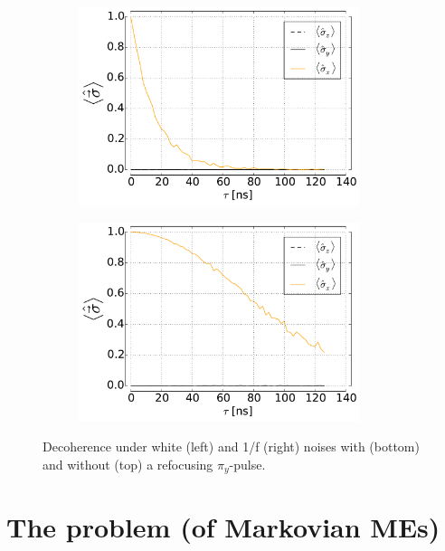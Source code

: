 \documentclass[12pt]{report}
\numberwithin{equation}{section}
\begin{document}
\begin{figure}
\begin{subfigure}[t]{0.45\textwidth}
\centering
\includegraphics[width=0.9\textwidth]{deph_white_se}
\end{subfigure}
\begin{subfigure}[t]{0.45\textwidth}
\centering
\includegraphics[width=0.9\textwidth]{deph_pink_se}
\end{subfigure}
\caption{Decoherence under white (left) and 1/f (right) noises with (bottom) and without (top) a refocusing $\pi_y$-pulse.}
\label{fig:cdeph_both}
\endgroup
\end{figure}

\section{The problem (of Markovian MEs)}
\end{document}
